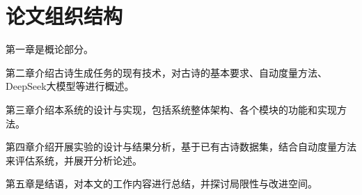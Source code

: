 \section{论文组织结构}

    第一章是概论部分。
    
    第二章介绍古诗生成任务的现有技术，对古诗的基本要求、自动度量方法、DeepSeek大模型等进行概述。

    第三章介绍本系统的设计与实现，包括系统整体架构、各个模块的功能和实现方法。

    第四章介绍开展实验的设计与结果分析，基于已有古诗数据集，结合自动度量方法来评估系统，并展开分析论述。

    第五章是结语，对本文的工作内容进行总结，并探讨局限性与改进空间。
  


